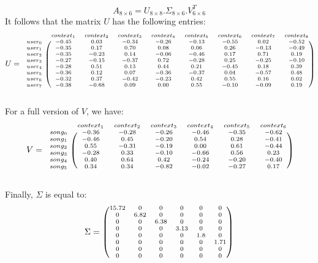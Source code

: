 \documentclass[a4,12pt,twosided,openany]{memoir}
\begin{document}
\[A_{8 \times 6}  = U_{8 \times 8} . \Sigma_{8 \times 6} . V^T_{6 \times 6}\]
It follows that the matrix $U$ has the following entries:
\[
\scriptsize{
U = 
 \begin{blockarray}{ccccccccc}
& context_1 & context_2 & context_3 & context_4 & context_5 & context_6 & context_7 & context_8\\
\begin{block}{c(cccccccc)}
user_0 & -0.45 & 0.03 & -0.34 & -0.26 & -0.13 & -0.55 &  0.02 & -0.52 \\
user_1 & -0.35 &  0.17 &  0.70 &  0.08 &  0.06 &  0.26 & -0.13 & -0.49 \\
user_2 & -0.35 & -0.23 &  0.14 & -0.06 & -0.46 &  0.17 &  0.71 &  0.19 \\
user_3 & -0.27 & -0.15 & -0.37 &  0.72 & -0.28 &  0.25 & -0.25 & -0.10 \\
user_4 & -0.28 &  0.51 &  0.13 &  0.44 &  0.21 & -0.45 &  0.18 &  0.39\\
user_5 & -0.36 &  0.12 &  0.07 & -0.36 & -0.37 &  0.04 & -0.57 &  0.48\\
user_6 & -0.32&  0.37 & -0.42 & -0.23 &  0.42 &  0.55 &  0.16 &  0.02 \\
user_7 & -0.38 & -0.68 &  0.09 &  0.00 &  0.55 & -0.10 & -0.09 &  0.19 \\
\end{block}
\end{blockarray}
}
\]
\par 
\indent
For a full version of $V$, we have:
\[
\scriptsize{
V = 
 \begin{blockarray}{ccccccc}
& context_1 & context_2 & context_3 & context_4 & context_5& context_6\\
\begin{block}{c(cccccc)}
song_0 & -0.36 & -0.28 & -0.26 & -0.46 & -0.35 & -0.62 \\
song_1 & -0.46 &  0.45 & -0.20 &  0.54 &  0.28 & -0.41 \\
song_2 &  0.55 & -0.31 & -0.19 &  0.00 &  0.61 & -0.44 \\
song_3 & -0.28 &  0.33 & -0.10 & -0.66 &  0.56 &  0.23 \\
song_4 &  0.40 &  0.64 &  0.42 & -0.24 & -0.20 & -0.40 \\
song_5 &  0.34 &  0.34 & -0.82 & -0.02 & -0.27 &  0.17\\
\end{block}
\end{blockarray}
}
\]
\par 
\indent
Finally, $\Sigma$ is equal to:
\[
\scriptsize{
\Sigma = 
\begin{pmatrix}
15.72 & 0 & 0 & 0 & 0 & 0 \\
0 & 6.82 & 0 & 0 & 0 & 0 \\
0 & 0 & 6.38 & 0 & 0 & 0 \\
0 & 0 & 0 & 3.13 & 0 & 0 \\
0 & 0 & 0 & 0 & 1.8 & 0 \\
0 & 0 & 0 & 0 & 0 & 1.71 \\
0 & 0 & 0 & 0 & 0 & 0 \\
0 & 0 & 0 & 0 & 0 & 0 \\
\end{pmatrix}
}
\]
\end{document}
